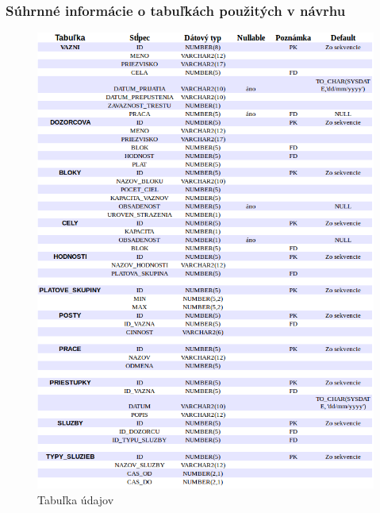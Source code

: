 \documentclass[slovak, 12pt, Times New Roman]{article}
\begin{document}
			\subsubsection{Súhrnné informácie o tabuľkách použitých v návrhu}
				\begin{figure}[!htb]
				\centering
				\includegraphics[scale=0.6]{suhrnneInfo.png}
				\caption{Tabuľka údajov}
				\label{fig:Reinforcement}
			\end{figure}
			\clearpage
\end{document}
